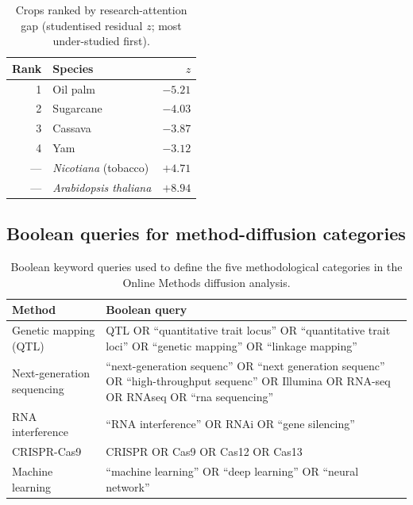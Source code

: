 \begin{table}[H]
\centering
\caption{Crops ranked by research-attention gap (studentised residual $z$;
most under-studied first).}
\label{tab:si-attention-gap}
\begin{tabular}{rlr}
\toprule
Rank & Species & $z$ \\
\midrule
1 & Oil palm & $-5.21$ \\
2 & Sugarcane & $-4.03$ \\
3 & Cassava & $-3.87$ \\
4 & Yam & $-3.12$ \\
--- & \textit{Nicotiana} (tobacco) & $+4.71$ \\
--- & \textit{Arabidopsis thaliana} & $+8.94$ \\
\bottomrule
\end{tabular}
\end{table}



\bigskip

\subsection*{Boolean queries for method-diffusion categories}

\begin{table}[H]
\centering
\caption{Boolean keyword queries used to define the five methodological
categories in the Online Methods diffusion analysis.}
\label{tab:query-strings}
\begin{tabular}{p{3.4cm}p{10.2cm}}
\toprule
Method & Boolean query \\
\midrule
Genetic mapping (QTL) &
  QTL OR ``quantitative trait locus'' OR ``quantitative trait loci''
  OR ``genetic mapping'' OR ``linkage mapping'' \\
Next-generation sequencing &
  ``next-generation sequenc'' OR ``next generation sequenc''
  OR ``high-throughput sequenc'' OR Illumina OR RNA-seq OR RNAseq
  OR ``rna sequencing'' \\
RNA interference &
  ``RNA interference'' OR RNAi OR ``gene silencing'' \\
CRISPR-Cas9 &
  CRISPR OR Cas9 OR Cas12 OR Cas13 \\
Machine learning &
  ``machine learning'' OR ``deep learning'' OR ``neural network'' \\
\bottomrule
\end{tabular}
\end{table}

\bigskip

